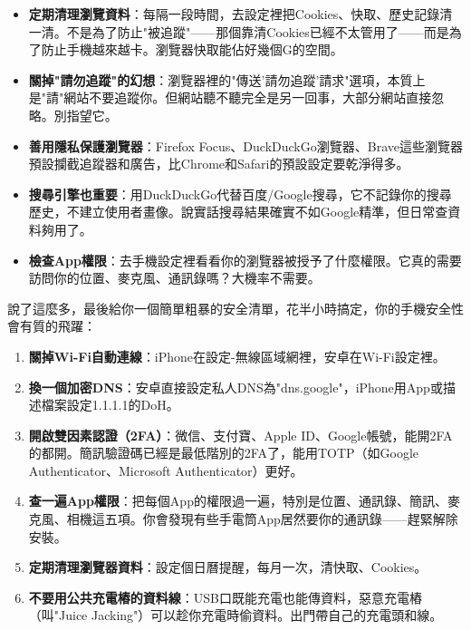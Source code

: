 \begin{itemize}
  \item \textbf{定期清理瀏覽資料}：每隔一段時間，去設定裡把Cookies、快取、歷史記錄清一清。不是為了防止"被追蹤"——那個靠清Cookies已經不太管用了——而是為了防止手機越來越卡。瀏覽器快取能佔好幾個G的空間。
  \item \textbf{關掉"請勿追蹤"的幻想}：瀏覽器裡的"傳送'請勿追蹤'請求"選項，本質上是"請"網站不要追蹤你。但網站聽不聽完全是另一回事，大部分網站直接忽略。別指望它。
  \item \textbf{善用隱私保護瀏覽器}：Firefox Focus、DuckDuckGo瀏覽器、Brave這些瀏覽器預設攔截追蹤器和廣告，比Chrome和Safari的預設設定要乾淨得多。
  \item \textbf{搜尋引擎也重要}：用DuckDuckGo代替百度/Google搜尋，它不記錄你的搜尋歷史，不建立使用者畫像。說實話搜尋結果確實不如Google精準，但日常查資料夠用了。
  \item \textbf{檢查App權限}：去手機設定裡看看你的瀏覽器被授予了什麼權限。它真的需要訪問你的位置、麥克風、通訊錄嗎？大機率不需要。
\end{itemize}


說了這麼多，最後給你一個簡單粗暴的安全清單，花半小時搞定，你的手機安全性會有質的飛躍：

\begin{enumerate}
  \item \textbf{關掉Wi-Fi自動連線}：iPhone在設定-無線區域網裡，安卓在Wi-Fi設定裡。
  \item \textbf{換一個加密DNS}：安卓直接設定私人DNS為"dns.google"，iPhone用App或描述檔案設定1.1.1.1的DoH。
  \item \textbf{開啟雙因素認證（2FA）}：微信、支付寶、Apple ID、Google帳號，能開2FA的都開。簡訊驗證碼已經是最低階別的2FA了，能用TOTP（如Google Authenticator、Microsoft Authenticator）更好。
  \item \textbf{查一遍App權限}：把每個App的權限過一遍，特別是位置、通訊錄、簡訊、麥克風、相機這五項。你會發現有些手電筒App居然要你的通訊錄——趕緊解除安裝。
  \item \textbf{定期清理瀏覽器資料}：設定個日曆提醒，每月一次，清快取、Cookies。
  \item \textbf{不要用公共充電樁的資料線}：USB口既能充電也能傳資料，惡意充電樁（叫"Juice Jacking"）可以趁你充電時偷資料。出門帶自己的充電頭和線。
\end{enumerate}

